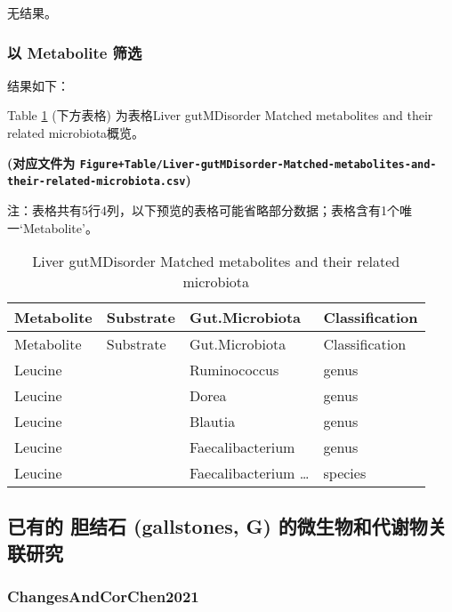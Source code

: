 \documentclass[
]{article}
\begin{document}
无结果。

\hypertarget{ux4ee5-metabolite-ux7b5bux9009}{%
\subsubsection{以 Metabolite 筛选}\label{ux4ee5-metabolite-ux7b5bux9009}}

结果如下：

Table \ref{tab:Liver-gutMDisorder-Matched-metabolites-and-their-related-microbiota} (下方表格) 为表格Liver gutMDisorder Matched metabolites and their related microbiota概览。

\textbf{(对应文件为 \texttt{Figure+Table/Liver-gutMDisorder-Matched-metabolites-and-their-related-microbiota.csv})}

\begin{center}\begin{tcolorbox}[colback=gray!10, colframe=gray!50, width=0.9\linewidth, arc=1mm, boxrule=0.5pt]注：表格共有5行4列，以下预览的表格可能省略部分数据；表格含有1个唯一`Metabolite'。
\end{tcolorbox}
\end{center}

\begin{longtable}[]{@{}llll@{}}
\caption{\label{tab:Liver-gutMDisorder-Matched-metabolites-and-their-related-microbiota}Liver gutMDisorder Matched metabolites and their related microbiota}\tabularnewline
\toprule
Metabolite & Substrate & Gut.Microbiota & Classification\tabularnewline
\midrule
\endfirsthead
\toprule
Metabolite & Substrate & Gut.Microbiota & Classification\tabularnewline
\midrule
\endhead
Leucine & & Ruminococcus & genus\tabularnewline
Leucine & & Dorea & genus\tabularnewline
Leucine & & Blautia & genus\tabularnewline
Leucine & & Faecalibacterium & genus\tabularnewline
Leucine & & Faecalibacterium \ldots{} & species\tabularnewline
\bottomrule
\end{longtable}

\hypertarget{ux5df2ux6709ux7684-ux80c6ux7ed3ux77f3-gallstones-g-ux7684ux5faeux751fux7269ux548cux4ee3ux8c22ux7269ux5173ux8054ux7814ux7a76}{%
\subsection{已有的 胆结石 (gallstones, G) 的微生物和代谢物关联研究}\label{ux5df2ux6709ux7684-ux80c6ux7ed3ux77f3-gallstones-g-ux7684ux5faeux751fux7269ux548cux4ee3ux8c22ux7269ux5173ux8054ux7814ux7a76}}

\hypertarget{s1}{%
\subsubsection{ChangesAndCorChen2021}\label{s1}}
\end{document}
